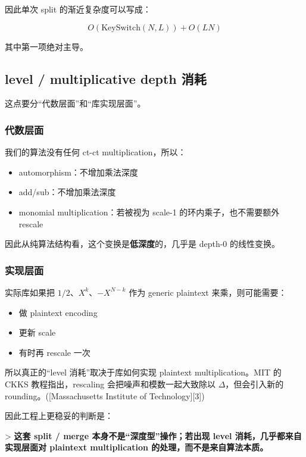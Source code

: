 \documentclass{article}
\begin{document}
因此单次 split 的渐近复杂度可以写成：

\[
\boxed{
O(\text{KeySwitch}(N,L)) + O(LN)
}
\]

其中第一项绝对主导。

\subsection{level / multiplicative depth 消耗}

这点要分“代数层面”和“库实现层面”。

\subsubsection{代数层面}

我们的算法没有任何 ct-ct multiplication，所以：

\begin{itemize}
    \item automorphism：不增加乘法深度
    \item add/sub：不增加乘法深度
    \item monomial multiplication：若被视为 scale-1 的环内乘子，也不需要额外 rescale
\end{itemize}

因此从纯算法结构看，这个变换是\textbf{低深度}的，几乎是 depth-0 的线性变换。

\subsubsection{实现层面}

实际库如果把 \(1/2\)、\(X^k\)、\(-X^{N-k}\) 作为 generic plaintext 来乘，则可能需要：

\begin{itemize}
    \item 做 plaintext encoding
    \item 更新 scale
    \item 有时再 rescale 一次
\end{itemize}

所以真正的“level 消耗”取决于库如何实现 plaintext multiplication。MIT 的 CKKS 教程指出，rescaling 会把噪声和模数一起大致除以 \(\Delta\)，但会引入新的 rounding。([Massachusetts Institute of Technology][3])

因此工程上更稳妥的判断是：

> \textbf{这套 split / merge 本身不是“深度型”操作；若出现 level 消耗，几乎都来自实现层面对 plaintext multiplication 的处理，而不是来自算法本质。}
\end{document}
